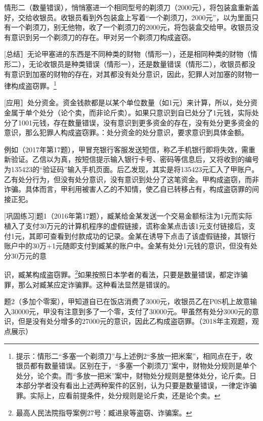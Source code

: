 情形二（数量错误），悄悄塞进一个相同型号的剃须刀（2000元），将包装盒重新盖好，交给收银员。收银员看到外包装盒上写着“一个剃须刀，2000元”，以为里面只有一个剃须刀，别无他物，收了一个剃须刀的2000元，将包装盒交给甲。收银员没有意识到另一个剃须刀的存在。甲对另一个剃须刀构成盗窃。

[总结］无论甲塞进的东西是不同种类的财物（情形一），还是相同种类的财物（情形二），无论收银员是种类错误（情形一），还是数量错误（情形二），收银员都没有意识到加塞的财物的存在，对其都没有处分意识，因此，犯罪人对加塞的财物一律构成盗窃罪。\footnote{提示：情形二“多塞一个剃须刀”与上述例2“多放一把米案”，相同点在于，收银员都有数量错误。区别在于，“多塞一个剃须刀”案中，财物处分规则是单个处分，论个卖。而“多放一把米”案中，财物处分规则是整体处分，论斤卖。日本部分学者没有看出上述两种案件的区别，认为只要是数量错误，一律定诈骗罪。实际上，应看前提条件，处分规则是论斤卖，还是论个卖。}


[应用］处分资金。资金钱款都是以某个单位数量（如1元）来计算，所以，处分资金属于单个处分（论个卖，而非论斤卖）。如果只意识到自已处分了1元钱，实际处分了1001元钱，存在数量错误，没有意识到更多资金的存在，没有处分更多资金的意识，那么犯罪人构成盗窃罪。：处分资金的处分意识，要求意识到具体金额。

例如（2017年第17题），甲冒充银行客服发送短信，称乙手机银行即将失效，需重新验证。乙信以为真，按短信提示输入银行卡号、密码等信息后，又将收到的编号为135423的“验证码”输入手机页面。后乙发现，其实是将135423元汇入了甲账户。乙有处分行为，但没有处分意识，没有意识到处分了这笔资金。甲构成盗窃，而非诈骗。具体而言，甲利用被害人乙的不知情，使乙自已转移占有，构成盗窃罪的间接正犯。

[巩固练习]题1（2016年第17题），臧某给金某发送一个交易金额标注为1元而实际植入了支付30万元的计算机程序的虚假链接，谎称金某点击该1元支付链接后，支付1元，其即可查看到付款成功的记录。金某在诱导下点击了该虚假链接，其银行账户中的30万+1元随即支付到臧某的账户中。金某有处分1元钱的意识，但没有处分30万元的意

识，臧某构成盗窃罪。\footnote{最高人民法院指导案例27号：臧进泉等盗窃、诈骗案。}如果按照日本学者的看法，只要是数量错误，都定诈骗罪，那么对臧某应定诈骗罪。这种看法显然是错误的。

题2（多加个零案），甲知道自已在饭店消费了3000元，收银员乙在P0S机上故意输入30000元，甲没有注意到多了一个零，支付了30000元。甲虽然有处分3000元的意识，但是没有处分增多的27000元的意识，因此乙构成盗窃罪。（2018年主观题，观点展示）

